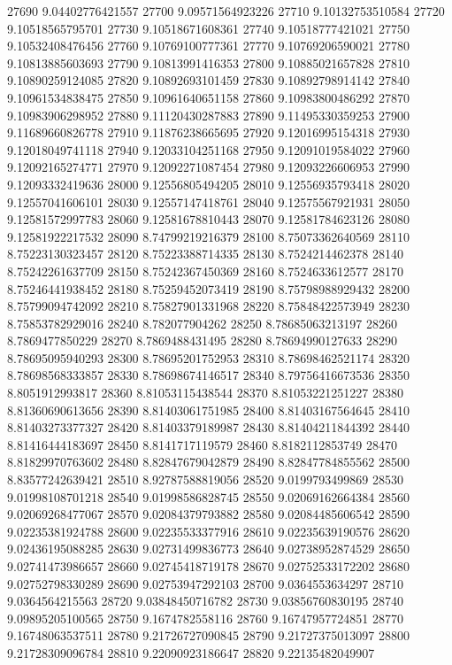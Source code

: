 {27690 9.04402776421557
27700 9.09571564923226
27710 9.10132753510584
27720 9.10518565795701
27730 9.10518671608361
27740 9.10518777421021
27750 9.10532408476456
27760 9.10769100777361
27770 9.10769206590021
27780 9.10813885603693
27790 9.10813991416353
27800 9.10885021657828
27810 9.10890259124085
27820 9.10892693101459
27830 9.10892798914142
27840 9.10961534838475
27850 9.10961640651158
27860 9.10983800486292
27870 9.10983906298952
27880 9.11120430287883
27890 9.11495330359253
27900 9.11689660826778
27910 9.11876238665695
27920 9.12016995154318
27930 9.12018049741118
27940 9.12033104251168
27950 9.12091019584022
27960 9.12092165274771
27970 9.12092271087454
27980 9.12093226606953
27990 9.12093332419636
28000 9.12556805494205
28010 9.12556935793418
28020 9.12557041606101
28030 9.12557147418761
28040 9.12575567921931
28050 9.12581572997783
28060 9.12581678810443
28070 9.12581784623126
28080 9.12581922217532
28090 8.74799219216379
28100 8.75073362640569
28110 8.75223130323457
28120 8.75223388714335
28130 8.7524214462378
28140 8.75242261637709
28150 8.75242367450369
28160 8.7524633612577
28170 8.75246441938452
28180 8.75259452073419
28190 8.75798988929432
28200 8.75799094742092
28210 8.75827901331968
28220 8.75848422573949
28230 8.75853782929016
28240 8.782077904262
28250 8.78685063213197
28260 8.7869477850229
28270 8.7869488431495
28280 8.78694990127633
28290 8.78695095940293
28300 8.78695201752953
28310 8.78698462521174
28320 8.78698568333857
28330 8.78698674146517
28340 8.79756416673536
28350 8.8051912993817
28360 8.81053115438544
28370 8.81053221251227
28380 8.81360690613656
28390 8.81403061751985
28400 8.81403167564645
28410 8.81403273377327
28420 8.81403379189987
28430 8.81404211844392
28440 8.81416444183697
28450 8.8141717119579
28460 8.8182112853749
28470 8.81829970763602
28480 8.82847679042879
28490 8.82847784855562
28500 8.83577242639421
28510 8.92787588819056
28520 9.0199793499869
28530 9.01998108701218
28540 9.01998586828745
28550 9.02069162664384
28560 9.02069268477067
28570 9.02084379793882
28580 9.02084485606542
28590 9.02235381924788
28600 9.02235533377916
28610 9.02235639190576
28620 9.02436195088285
28630 9.02731499836773
28640 9.02738952874529
28650 9.02741473986657
28660 9.02745418719178
28670 9.02752533172202
28680 9.02752798330289
28690 9.02753947292103
28700 9.0364553634297
28710 9.0364564215563
28720 9.03848450716782
28730 9.03856760830195
28740 9.09895205100565
28750 9.1674782558116
28760 9.16747957724851
28770 9.16748063537511
28780 9.21726727090845
28790 9.21727375013097
28800 9.21728309096784
28810 9.22090923186647
28820 9.22135482049907
}
